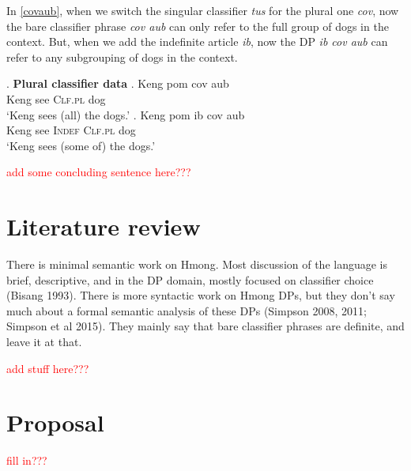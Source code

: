 \documentclass[a4paper,12pt,twoside]{article}
\begin{document}
In \ref{covaub}, when we switch the singular classifier \textit{tus} for the plural one \textit{cov}, now the bare classifier phrase \textit{cov aub} can only refer to the full group of dogs in the context. But, when we add the indefinite article \textit{ib}, now the DP \textit{ib cov aub} can refer to any subgrouping of dogs in the context. 

\ex.	\textbf{Plural classifier data}
\ag. \label{covaub}Keng pom cov aub\\
	Keng see \textsc{Clf.pl} dog\\
	`Keng sees (all) the dogs.'
\bg. \label{ibcovaub}Keng pom ib cov aub\\
	Keng see \textsc{Indef} \textsc{Clf.pl} dog\\
	`Keng sees (some of) the dogs.'

\textcolor{red}{add some concluding sentence here???}





\section{Literature review}

There is minimal semantic work on Hmong. Most discussion of the language is brief, descriptive, and in the DP domain, mostly focused on classifier choice (Bisang 1993). There is more syntactic work on Hmong DPs, but they don't say much about a formal semantic analysis of these DPs (Simpson 2008, 2011; Simpson et al 2015). They mainly say that bare classifier phrases are definite, and leave it at that. 

\textcolor{red}{add stuff here???}



\section{Proposal}

\textcolor{red}{fill in???}




\end{document}
